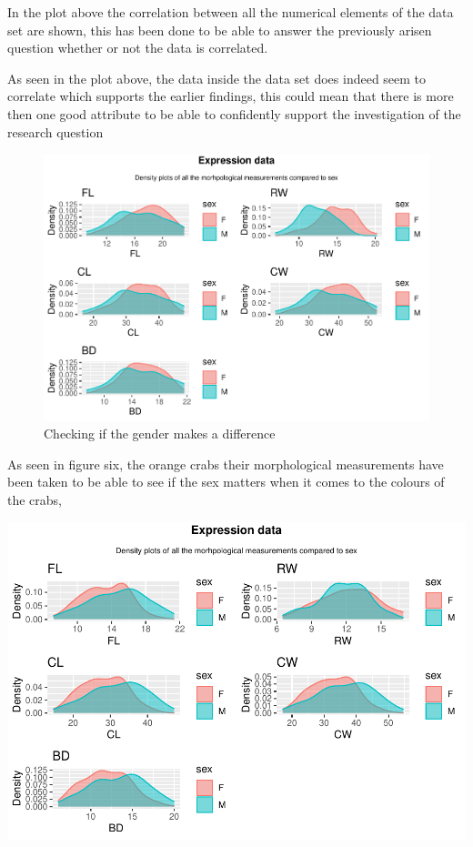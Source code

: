 \documentclass[
]{article}
\begin{document}
In the plot above the correlation between all the numerical elements of
the data set are shown, this has been done to be able to answer the
previously arisen question whether or not the data is correlated.

As seen in the plot above, the data inside the data set does indeed seem
to correlate which supports the earlier findings, this could mean that
there is more then one good attribute to be able to confidently support
the investigation of the research question

\begin{figure}[H]

{\centering \includegraphics{CrabProject_files/figure-latex/figure6-1} 

}

\caption{Checking if the gender makes a difference}\label{fig:figure6}
\end{figure}

As seen in figure six, the orange crabs their morphological measurements
have been taken to be able to see if the sex matters when it comes to
the colours of the crabs,

\begin{center}\includegraphics{CrabProject_files/figure-latex/figure 7-1} \end{center}
\end{document}

